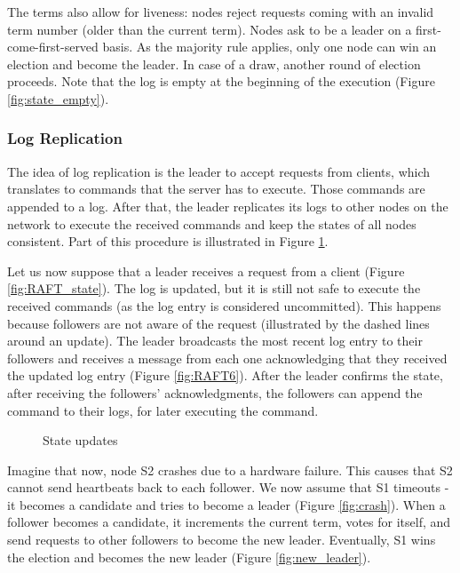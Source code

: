 \documentclass[12pt,a4paper]{article}
\begin{document}
The terms also allow for liveness: nodes reject requests coming with an invalid term number (older than the current term). Nodes ask to be a leader on a  first-come-first-served basis. As the majority rule applies, only one node can win an election and become the leader. In case of a draw, another round of election proceeds. Note that the log is empty at the beginning of the execution (Figure \ref{fig:state_empty}).





\subsubsection{Log Replication}
The idea of log replication is the leader to accept requests from clients, which translates to commands that the server has to execute. Those commands are appended to a log. After that, the leader replicates its logs to other nodes on the network to execute the received commands and keep the states of all nodes consistent. Part of this procedure is illustrated in Figure \ref{fig:su_2}.

Let us now suppose that a leader receives a request from a client (Figure \ref{fig:RAFT_state}). The log is updated, but it is still not safe to execute the received commands (as the log entry is considered uncommitted). This happens because followers are not aware of the request (illustrated by the dashed lines around an update). The leader broadcasts the most recent log entry to their followers and receives a message from each one acknowledging that they received the updated log entry (Figure \ref{fig:RAFT6}). After the leader confirms the state, after receiving the followers' acknowledgments, the followers can append the command to their logs, for later executing the command.


\begin{figure}[h!]
\centering
{}%
\qquad
{}%
\caption{State updates}%
\label{fig:su_2}%
\end{figure}

Imagine that now, node S2 crashes due to a hardware failure. This causes that S2 cannot send heartbeats back to each follower. We now assume that S1 timeouts - it becomes a candidate and tries to become a leader (Figure \ref{fig:crash}). When a follower becomes a candidate, it increments the current term, votes for itself, and send requests to other followers to become the new leader. Eventually, S1 wins the election and becomes the new leader (Figure \ref{fig:new_leader}).
\end{document}

